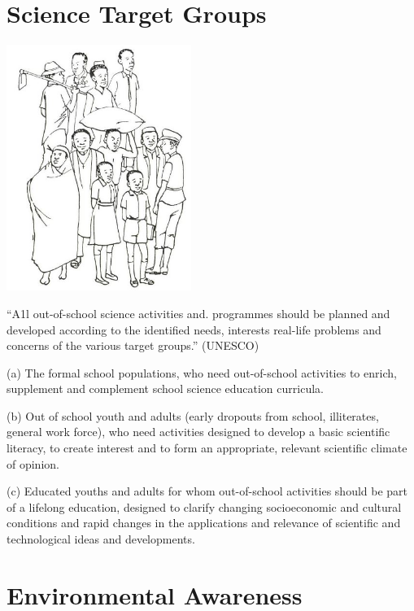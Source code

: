 \begin{multicols}{2}
\section{Science Target Groups}

\begin{center}
\includegraphics[width=0.45\textwidth]{./img/source/target-groups.jpg}
\end{center}

``A1l out-of-school science activities and.
programmes should be planned and developed
according to the identified needs, interests
real-life problems and concerns of the various
target groups.'' (UNESCO)

(a) The formal school populations, who need
out-of-school activities to enrich, supplement
and complement school science education
curricula.

(b) Out of school youth and adults (early
dropouts from school, illiterates, general work
force), who need activities designed to develop
a basic scientific literacy, to create interest and
to form an appropriate, relevant scientific
climate of opinion.

(c) Educated youths and adults for whom out-of-school activities should be part of a lifelong
education, designed to clarify changing socioeconomic
and cultural conditions and rapid
changes in the applications and relevance of
scientific and technological ideas and
developments.


\section{Environmental Awareness}


\end{multicols}
